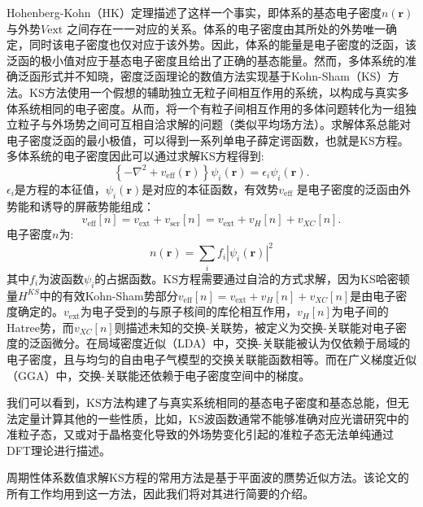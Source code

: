 \documentclass[phd,nobackinfo]{scutthesis}
\begin{document}
Hohenberg-Kohn（HK）定理描述了这样一个事实，即体系的基态电子密度$n(\bm{r})$与外势$V\mathrm{ext}$ 之间存在一一对应的关系。体系的电子密度由其所处的外势唯一确定，同时该电子密度也仅对应于该外势。因此，体系的能量是电子密度的泛函，该泛函的极小值对应于基态电子密度且给出了正确的基态能量。然而，多体系统的准确泛函形式并不知晓，密度泛函理论的数值方法实现基于Kohn-Sham（KS）方法。KS方法使用一个假想的辅助独立无粒子间相互作用的系统，以构成与真实多体系统相同的电子密度。从而，将一个有粒子间相互作用的多体问题转化为一组独立粒子与外场势之间可互相自洽求解的问题（类似平均场方法）。求解体系总能对电子密度泛函的最小极值，可以得到一系列单电子薛定谔函数，也就是KS方程。多体系统的电子密度因此可以通过求解KS方程得到:
\begin{equation}
  \left\{ -\nabla^2 + v_{\mathrm{eff}}(\bm{r}) \right\}\psi_i(\bm{r}) = \epsilon_i \psi_i (\bm{r}).
\end{equation}
$\epsilon_i$是方程的本征值，$\psi_i(\bm{r})$是对应的本征函数，有效势$v_{\mathrm{eff}}$ 是电子密度的泛函由外势能和诱导的屏蔽势能组成：
\begin{equation}
  v_{\mathrm{eff}}[n] = v_{\mathrm{ext}} + v_{\mathrm{scr}}[n] =
  v_{\mathrm{ext}} + v_{H}[n] + v_{XC}[n].
\end{equation}
电子密度$n$为:
\begin{equation}
  n(\bm{r}) = \sum_i f_i |\psi_i(\bm{r})|^2
\end{equation}
其中$f_i$为波函数$\psi_i$的占据函数。KS方程需要通过自洽的方式求解，因为KS哈密顿量$H^{KS}$中的有效Kohn-Sham势部分$v_{\mathrm{eff}}[n]=v_{\mathrm{ext}} + v_{H}[n] + v_{XC}[n]$是由电子密度确定的。$v_{\mathrm{ext}}$为电子受到的与原子核间的库伦相互作用，$v_{H}[n]$为电子间的Hatree势，而$v_{XC}[n]$则描述未知的交换-关联势，被定义为交换-关联能对电子密度的泛函微分。在局域密度近似（LDA）中，交换-关联能被认为仅依赖于局域的电子密度，且与均匀的自由电子气模型的交换关联能函数相等。而在广义梯度近似（GGA）中，交换-关联能还依赖于电子密度空间中的梯度。

我们可以看到，KS方法构建了与真实系统相同的基态电子密度和基态总能，但无法定量计算其他的一些性质，比如，KS波函数通常不能够准确对应光谱研究中的准粒子态，又或对于晶格变化导致的外场势变化引起的准粒子态无法单纯通过DFT理论进行描述。

周期性体系数值求解KS方程的常用方法是基于平面波的赝势近似方法。该论文的所有工作均用到这一方法，因此我们将对其进行简要的介绍。
\end{document}
